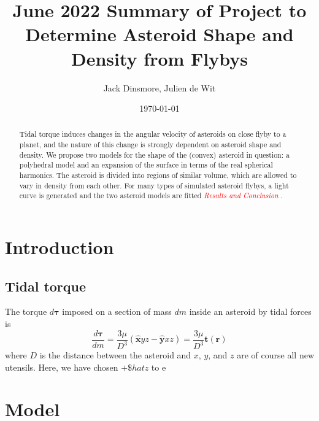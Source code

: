 \documentclass[aps,twocolumn,secnumarabic,balancelastpage,amsmath,amssymb,nofootinbib,floatfix]{revtex4-1}
\begin{document}
\title{June 2022 Summary of Project to Determine Asteroid Shape and Density from Flybys}
\author{Jack Dinsmore, Julien de Wit}
\date{\today}

\newcommand{\parens}[1]{\left( #1 \right)}
\newcommand{\brackets}[1]{\left[ #1 \right]}
\newcommand{\comment}[1]{\textcolor{red}{\emph{ #1 }}}






\begin{abstract}
    Tidal torque induces changes in the angular velocity of asteroids on close flyby to a planet, and the nature of this change is strongly dependent on asteroid shape and density. We propose two models for the shape of the (convex) asteroid in question: a polyhedral model and an expansion of the surface in terms of the real spherical harmonics. The asteroid is divided into regions of similar volume, which are allowed to vary in density from each other. For many types of simulated asteroid flybys, a light curve is generated and the two asteroid models are fitted \comment{Results and Conclusion}.
\end{abstract}

\maketitle



\section{Introduction}
\subsection{Tidal torque}
The torque $d\bm{\tau}$ imposed on a section of mass $dm$ inside an asteroid by tidal forces is
\begin{equation}
    \frac{d\bm{\tau}}{dm} =\frac{3\mu}{D^3} (\bm{\hat x} yz - \bm{\hat y} xz) = \frac{3\mu}{D^3} \bm{t}(\bm{r})
    \label{eqn:diff-torque}
\end{equation}
where $D$ is the distance between the asteroid and $x$, $y$, and $z$ are of course all new utensils. Here, we have chosen $+\$hat z$ to e

\section{Model}
\end{document}
